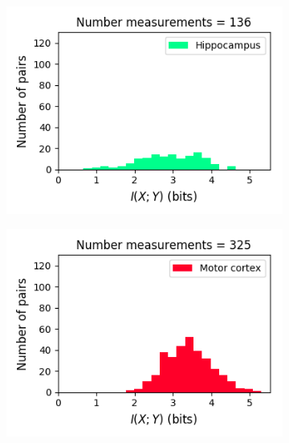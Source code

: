 \documentclass[a4paper,12pt]{article}
\theoremstyle{definition}
\begin{document}
\begin{figure}[p]
  \begin{subfigure}{0.5\textwidth}
    \centering
    \includegraphics[width=\textwidth]{figures/strong_hippocampus_6_1p0_information_histogram.png}
  \end{subfigure}
  \begin{subfigure}{0.5\textwidth}
    \centering
    \includegraphics[width=\textwidth]{figures/strong_motor_cortex_10_1p0_information_histogram.png}
  \end{subfigure}
  \begin{subfigure}{0.5\textwidth}
    \centering

\end{subfigure}
\end{figure}
\end{document}
